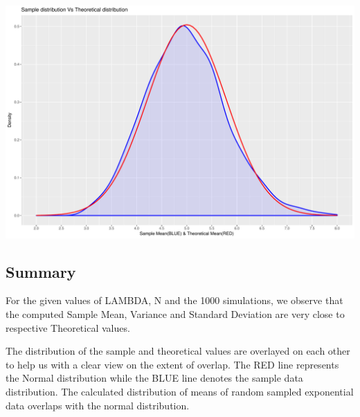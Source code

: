 \documentclass[]{article}
\begin{document}
\includegraphics{Statistical_Inference_Project_1_files/figure-latex/unnamed-chunk-4-1.pdf}

\subsection{Summary}\label{summary}

For the given values of LAMBDA, N and the 1000 simulations, we observe
that the computed Sample Mean, Variance and Standard Deviation are very
close to respective Theoretical values.

The distribution of the sample and theoretical values are overlayed on
each other to help us with a clear view on the extent of overlap. The
RED line represents the Normal distribution while the BLUE line denotes
the sample data distribution. The calculated distribution of means of
random sampled exponential data overlaps with the normal distribution.
\end{document}

